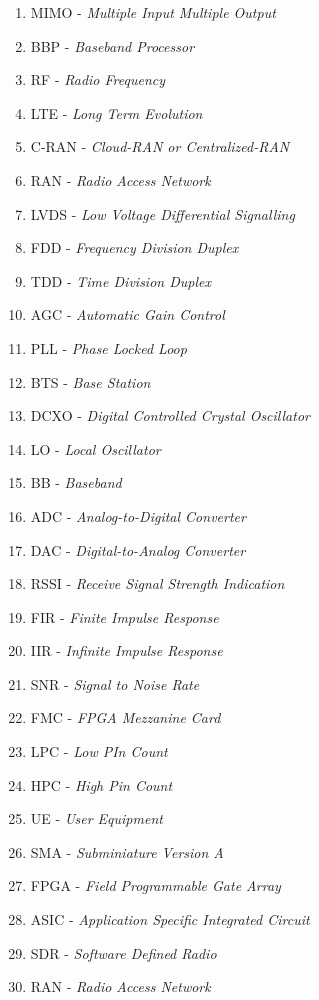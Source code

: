 \begin{enumerate}
	\item MIMO - \textit{Multiple Input Multiple Output}
	\item BBP - \textit{Baseband Processor}
	\item RF - \textit{Radio Frequency}
	\item LTE - \textit{Long Term Evolution}
	\item C-RAN - \textit{Cloud-RAN or Centralized-RAN}
	\item RAN - \textit{Radio Access Network}
	\item LVDS - \textit{Low Voltage Differential Signalling}
	\item FDD - \textit{Frequency Division Duplex}
	\item TDD - \textit{Time Division Duplex}
	\item AGC - \textit{Automatic Gain Control}
	\item PLL - \textit{Phase Locked Loop}
	\item BTS - \textit{Base Station}
	\item DCXO - \textit{Digital Controlled Crystal Oscillator}
	\item LO - \textit{Local Oscillator}
	\item BB - \textit{Baseband}
	\item ADC - \textit{Analog-to-Digital Converter}
	\item DAC - \textit{Digital-to-Analog Converter}
	\item RSSI - \textit{Receive Signal Strength Indication}
	\item FIR - \textit{Finite Impulse Response}
	\item IIR - \textit{Infinite Impulse Response}
	\item SNR - \textit{Signal to Noise Rate}
	\item FMC - \textit{FPGA Mezzanine Card}
	\item LPC - \textit{Low PIn Count}
	\item HPC - \textit{High Pin Count}
	\item UE - \textit{User Equipment}
	\item SMA - \textit{Subminiature Version A}
	\item FPGA - \textit{Field Programmable Gate Array}
	\item ASIC - \textit{Application Specific Integrated Circuit}
	\item SDR - \textit{Software Defined Radio}
	\item RAN - \textit{Radio Access Network}

\end{enumerate}
